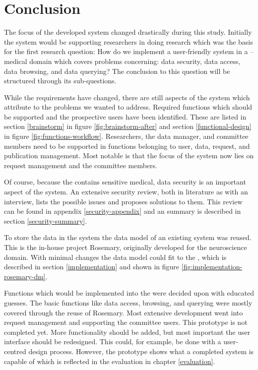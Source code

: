 \section{Conclusion}

The focus of the developed system changed drastically during this study.
Initially the system would be supporting researchers in doing research which was the basis for the first research question:
How do we implement a user-friendly system in a \IVF{}--\PRN{} medical domain which covers problems concerning: data security, data access, data browsing, and data querying?
The conclusion to this question will be structured through its sub-questions.

While the requirements have changed, there are still aspects of the system which attribute to the problems we wanted to address.
Required functions which should be supported and the prospective users have been identified.
These are listed in section \ref{brainstorm} in figure \ref{fig:brainstorm-after} and section \ref{functional-design} in figure \ref{fig:functions-workflow}.
Researchers, the data manager, and committee members need to be supported in functions belonging to user, data, request, and publication management.
Most notable is that the focus of the system now lies on request management and the committee members.

Of course, because the \projectdata{} contains sensitive medical, data security is an important aspect of the system.
An extensive security review, both in literature as with an interview, lists the possible issues and proposes solutions to them.
This review can be found in appendix \ref{security-appendix} and an summary is described in section \ref{security-summary}.

To store the data in the system the data model of an existing system was reused.
This is the in-house project Rosemary, originally   developed for the neuroscience domain.
With minimal changes the data model could fit to the \projectdata{}, which is described in section \ref{implementation} and shown in figure \ref{fig:implementation-rosemary-dm}.

Functions which would be implemented into the \ivfprototype{} were decided upon with educated guesses.
The basic functions like data access, browsing, and querying were mostly covered through the reuse of Rosemary.
Most extensive development went into request management and supporting the committee users.
This prototype is not completed yet.
More functionality should be added, but most important the user interface should be redesigned.
This could, for example, be done with a user-centred design process.
However, the prototype shows what a completed system is capable of which is reflected in the evaluation in chapter \ref{evaluation}.

